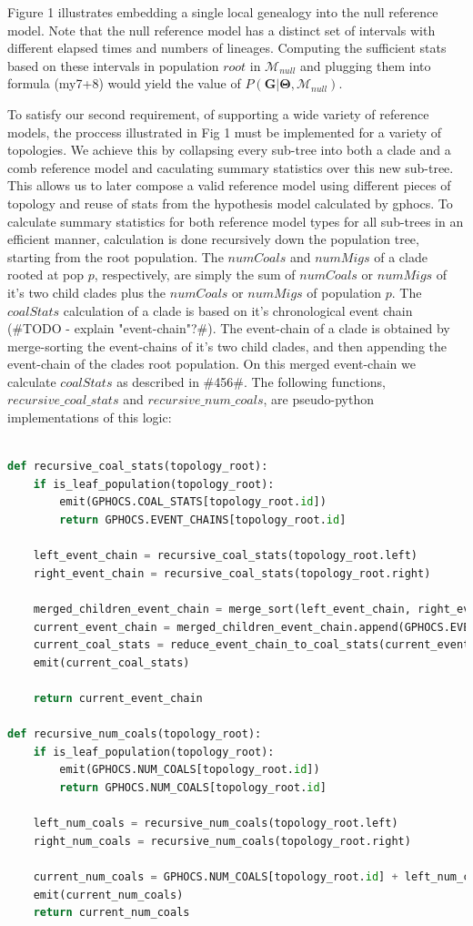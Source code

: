 \documentclass[11pt]{article}
\newcommand{\vect}[1]{\boldsymbol{\mathbf{#1}}}
\newcommand{\M}{\mathcal{M}}
\newcommand{\G}{\vect{G}}
\newcommand{\T}{\vect{\Theta}}
\newcommand{\Mnull}{\M_{null}}
\newcommand{\1}{\mathbbm{1}}
\begin{document}
Figure 1 illustrates embedding a single local genealogy into the null reference model. Note that the null reference model has a distinct set of intervals with different elapsed times and numbers of lineages. Computing the sufficient stats based on these intervals in population $root$  in $\Mnull$ and plugging them into formula (my7+8) would yield the value of $P(\G| \T,\Mnull)$.

To satisfy our second requirement, of supporting a wide variety of reference models, the proccess illustrated in Fig 1 must be implemented for a variety of topologies. We achieve this by collapsing every sub-tree into both a clade and a comb reference model and caculating summary statistics over this new sub-tree. This allows us to later compose a valid reference model using different pieces of topology and reuse of stats from the hypothesis model calculated by gphocs.
%
To calculate summary statistics for both reference model types for all sub-trees in an efficient manner, calculation is done recursively down the population tree, starting from the root population. The $numCoals$ and $numMigs$ of a clade rooted at pop $p$, respectively, are simply the sum of $numCoals$ or $numMigs$ of it's two child clades plus the $numCoals$ or $numMigs$ of population $p$.
%
The $coalStats$ calculation of a clade is based on it's chronological event chain (\#TODO - explain "event-chain"?\#). The event-chain of a clade is obtained by merge-sorting the event-chains of it's two child clades, and then appending the event-chain of the clades root population. On this merged event-chain we calculate $coalStats$ as described in \#456\#. The following functions, $recursive\_coal\_stats$ and $recursive\_num\_coals$, are pseudo-python implementations of this logic:
%
\begin{lstlisting}[language=Python]

def recursive_coal_stats(topology_root):
    if is_leaf_population(topology_root):
        emit(GPHOCS.COAL_STATS[topology_root.id])
        return GPHOCS.EVENT_CHAINS[topology_root.id]

    left_event_chain = recursive_coal_stats(topology_root.left)
    right_event_chain = recursive_coal_stats(topology_root.right)

    merged_children_event_chain = merge_sort(left_event_chain, right_event_chain)
    current_event_chain = merged_children_event_chain.append(GPHOCS.EVENT_CHAINS[topology_root.id])
    current_coal_stats = reduce_event_chain_to_coal_stats(current_event_chain)
    emit(current_coal_stats)

    return current_event_chain

def recursive_num_coals(topology_root):
    if is_leaf_population(topology_root):
        emit(GPHOCS.NUM_COALS[topology_root.id])
        return GPHOCS.NUM_COALS[topology_root.id]

    left_num_coals = recursive_num_coals(topology_root.left)
    right_num_coals = recursive_num_coals(topology_root.right)

    current_num_coals = GPHOCS.NUM_COALS[topology_root.id] + left_num_coals + right_num_coals
    emit(current_num_coals)
    return current_num_coals

\end{lstlisting}
\end{document}
